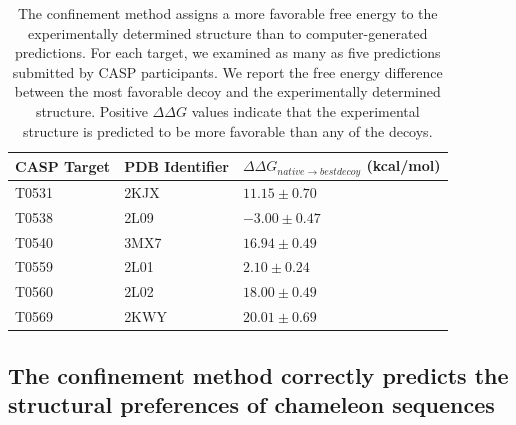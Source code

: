 \documentclass[12pt]{article}
\begin{document}
\begin{table}
\begin{center}
\caption{The confinement method assigns a more favorable free energy to the experimentally
    determined structure than to computer-generated predictions. For each target, we examined as
    many as five predictions submitted by CASP participants. We report the free energy difference
    between the most favorable decoy and the experimentally determined structure. Positive
    $\Delta\Delta G$ values indicate that the experimental structure is predicted to be more
favorable than any of the decoys.}
\label{table:casp_control}
\begin{tabular}{l l l}\hline
    CASP Target  & PDB Identifier & $\Delta\Delta G_{native \to best decoy}$ (kcal/mol) \\ \hline
     T0531       &    2KJX        &          $11.15 \pm 0.70$ \\ \hline
     T0538       &    2L09        &          $-3.00 \pm 0.47$ \\ \hline
     T0540       &    3MX7        &          $16.94 \pm 0.49$ \\ \hline
     T0559       &    2L01        &          $2.10 \pm 0.24$ \\ \hline
     T0560       &    2L02        &          $18.00 \pm 0.49$ \\ \hline
     T0569       &    2KWY        &          $20.01 \pm 0.69$  \\ \hline
\end{tabular}
\end{center}
\end{table}


\subsection{The confinement method correctly predicts the structural preferences of chameleon
sequences}
\end{document}
